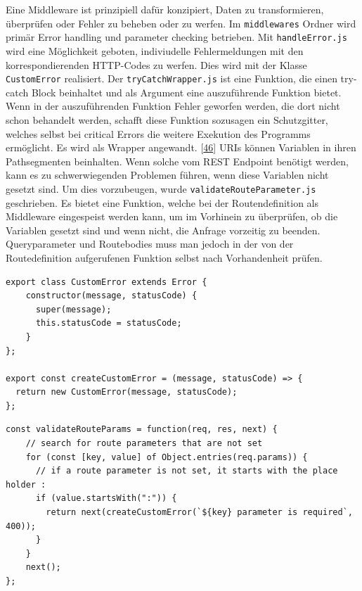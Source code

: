 \documentclass[
    headings=optiontotocandhead,%
    twoside,
    numbers=noenddot,%
    12pt, %
    titlepage, %
    parskip=full, %
    listof=leveldown, 
    numbers=noenddot, %
    a4paper,DIV=14,
    BCOR=15mm,
]{scrbook}
\newcommand{\passthrough}[1]{#1}
\begin{document}
Eine Middleware ist prinzipiell dafür konzipiert, Daten zu
transformieren, überprüfen oder Fehler zu beheben oder zu werfen. Im
\passthrough{\lstinline!middlewares!} Ordner wird primär Error handling
und parameter checking betrieben. Mit
\passthrough{\lstinline!handleError.js!} wird eine Möglichkeit geboten,
indiviudelle Fehlermeldungen mit den korrespondierenden HTTP-Codes zu
werfen. Dies wird mit der Klasse \passthrough{\lstinline!CustomError!}
realisiert. Der \passthrough{\lstinline!tryCatchWrapper.js!} ist eine
Funktion, die einen try-catch Block beinhaltet und als Argument eine
auszuführende Funktion bietet. Wenn in der auszuführenden Funktion
Fehler geworfen werden, die dort nicht schon behandelt werden, schafft
diese Funktion sozusagen ein Schutzgitter, welches selbst bei critical
Errors die weitere Exekution des Programms ermöglicht. Es wird als
Wrapper angewandt. {[}\protect\hyperlink{ref-medium-rest-api}{46}{]}
URIs können Variablen in ihren Pathsegmenten beinhalten. Wenn solche vom
REST Endpoint benötigt werden, kann es zu schwerwiegenden Problemen
führen, wenn diese Variablen nicht gesetzt sind. Um dies vorzubeugen,
wurde \passthrough{\lstinline!validateRouteParameter.js!} geschrieben.
Es bietet eine Funktion, welche bei der Routendefinition als Middleware
eingespeist werden kann, um im Vorhinein zu überprüfen, ob die Variablen
gesetzt sind und wenn nicht, die Anfrage vorzeitig zu beenden.
Queryparameter und Routebodies muss man jedoch in der von der
Routedefinition aufgerufenen Funktion selbst nach Vorhandenheit prüfen.

\begin{lstlisting}[caption={Erstellen einer individuellen Error Klasse}]
export class CustomError extends Error {
    constructor(message, statusCode) {
      super(message);
      this.statusCode = statusCode;
    }
};
  
export const createCustomError = (message, statusCode) => {
  return new CustomError(message, statusCode);
};
\end{lstlisting}

\begin{lstlisting}[caption={Überprüfen der Vorhandenheit von Path Variablen bei REST Endpoints}]
const validateRouteParams = function(req, res, next) {
    // search for route parameters that are not set
    for (const [key, value] of Object.entries(req.params)) {
      // if a route parameter is not set, it starts with the place holder :
      if (value.startsWith(":")) {
        return next(createCustomError(`${key} parameter is required`, 400));
      }
    }
    next();
};
\end{lstlisting}
\end{document}
